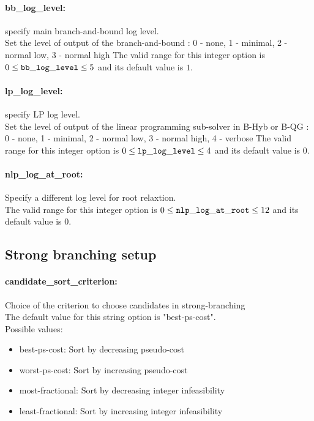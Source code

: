 \paragraph{bb\_log\_level:}\label{sec:bb_log_level} specify main branch-and-bound log level. $\;$ \\
 Set the level of output of the branch-and-bound :
0 - none, 1 - minimal, 2 - normal low, 3 - normal
high The valid range for this integer option is
$0 \le {\tt bb\_log\_level } \le 5$
and its default value is $1$.


\paragraph{lp\_log\_level:}\label{sec:lp_log_level} specify LP log level. $\;$ \\
 Set the level of output of the linear programming
sub-solver in B-Hyb or B-QG : 0 - none, 1 -
minimal, 2 - normal low, 3 - normal high, 4 -
verbose The valid range for this integer option is
$0 \le {\tt lp\_log\_level } \le 4$
and its default value is $0$.


\paragraph{nlp\_log\_at\_root:}\label{sec:nlp_log_at_root}  Specify a different log level for root relaxtion. $\;$ \\
 The valid range for this integer option is
$0 \le {\tt nlp\_log\_at\_root } \le 12$
and its default value is $0$.


\subsection{Strong branching setup}
\label{sec:Strong_branching_setup}
\paragraph{candidate\_sort\_criterion:}\label{sec:candidate_sort_criterion} Choice of the criterion to choose candidates in strong-branching $\;$ \\

The default value for this string option is "best-ps-cost".
\\ 
Possible values:
\begin{itemize}
   \item best-ps-cost: Sort by decreasing pseudo-cost
   \item worst-ps-cost: Sort by increasing pseudo-cost
   \item most-fractional: Sort by decreasing integer infeasibility
   \item least-fractional: Sort by increasing integer infeasibility
\end{itemize}

